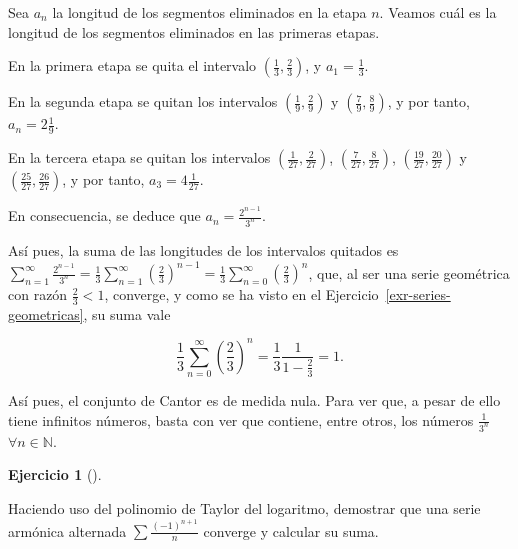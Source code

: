\documentclass[
  spanish,
  a4paper,
]{scrreport}
\theoremstyle{definition}
\newtheorem{exercise}{Ejercicio}[chapter]
\theoremstyle{remark}
\begin{document}
\begin{tcolorbox}[enhanced jigsaw, arc=.35mm, bottomrule=.15mm, bottomtitle=1mm, breakable, colback=white, colbacktitle=quarto-callout-tip-color!10!white, colframe=quarto-callout-tip-color-frame, coltitle=black, left=2mm, leftrule=.75mm, opacityback=0, opacitybacktitle=0.6, rightrule=.15mm, title=\textcolor{quarto-callout-tip-color}{\faLightbulb}\hspace{0.5em}{Solución}, titlerule=0mm, toprule=.15mm, toptitle=1mm]

Sea \(a_n\) la longitud de los segmentos eliminados en la etapa \(n\).
Veamos cuál es la longitud de los segmentos eliminados en las primeras
etapas.

En la primera etapa se quita el intervalo
\(\left(\frac{1}{3},\frac{2}{3}\right)\), y \(a_1 = \frac{1}{3}\).

En la segunda etapa se quitan los intervalos
\(\left(\frac{1}{9},\frac{2}{9}\right)\) y
\(\left(\frac{7}{9},\frac{8}{9}\right)\), y por tanto,
\(a_n = 2\frac{1}{9}\).

En la tercera etapa se quitan los intervalos
\(\left(\frac{1}{27},\frac{2}{27}\right)\),
\(\left(\frac{7}{27},\frac{8}{27}\right)\),
\(\left(\frac{19}{27},\frac{20}{27}\right)\) y
\(\left(\frac{25}{27},\frac{26}{27}\right)\), y por tanto,
\(a_3=4\frac{1}{27}\).

En consecuencia, se deduce que \(a_n=\frac{2^{n-1}}{3^n}\).

Así pues, la suma de las longitudes de los intervalos quitados es
\(\sum_{n=1}^\infty \frac{2^{n-1}}{3^n} = \frac{1}{3}\sum_{n=1}^\infty \left(\frac{2}{3}\right)^{n-1} = \frac{1}{3}\sum_{n=0}^\infty \left(\frac{2}{3}\right)^n\),
que, al ser una serie geométrica con razón \(\frac{2}{3}<1\), converge,
y como se ha visto en el Ejercicio~\ref{exr-series-geometricas}, su suma
vale

\[
\frac{1}{3}\sum_{n=0}^\infty \left(\frac{2}{3}\right)^n = \frac{1}{3}\frac{1}{1-\frac{2}{3}} = 1.
\]

Así pues, el conjunto de Cantor es de medida nula. Para ver que, a pesar
de ello tiene infinitos números, basta con ver que contiene, entre
otros, los números \(\frac{1}{3^n}\) \(\forall n\in\mathbb{N}\).

\end{tcolorbox}

\begin{exercise}[]\protect\hypertarget{exr-serie-armonica-alternada}{}\label{exr-serie-armonica-alternada}

Haciendo uso del polinomio de Taylor del logaritmo, demostrar que una
serie armónica alternada \(\sum \frac{(-1)^{n+1}}{n}\) converge y
calcular su suma.

\end{exercise}
\end{document}
